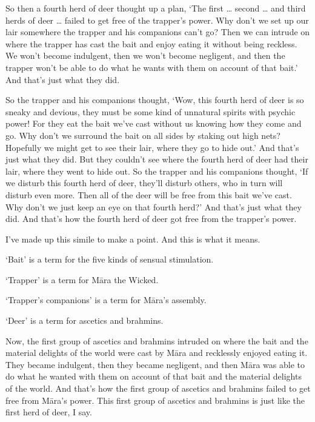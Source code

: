 \documentclass[12pt,openany]{book}%
\begin{document}
So then a fourth herd of deer thought up a plan, ‘The first … second … and third herds of deer … failed to get free of the trapper’s power. Why don’t we set up our lair somewhere the trapper and his companions can’t go? Then we can intrude on where the trapper has cast the bait and enjoy eating it without being reckless. We won’t become indulgent, then we won’t become negligent, and then the trapper won’t be able to do what he wants with them on account of that bait.’ And that’s just what they did. 

So the trapper and his companions thought, ‘Wow, this fourth herd of deer is so sneaky and devious, they must be some kind of unnatural spirits with psychic power! For they eat the bait we’ve cast without us knowing how they come and go. Why don’t we surround the bait on all sides by staking out high nets? Hopefully we might get to see their lair, where they go to hide out.’ And that’s just what they did. But they couldn’t see where the fourth herd of deer had their lair, where they went to hide out. So the trapper and his companions thought, ‘If we disturb this fourth herd of deer, they’ll disturb others, who in turn will disturb even more. Then all of the deer will be free from this bait we’ve cast. Why don’t we just keep an eye on that fourth herd?’ And that’s just what they did. And that’s how the fourth herd of deer got free from the trapper’s power. 

I’ve made up this simile to make a point. And this is what it means. 

‘Bait’ is a term for the five kinds of sensual stimulation. 

‘Trapper’ is a term for \textsanskrit{Māra} the Wicked. 

‘Trapper’s companions’ is a term for \textsanskrit{Māra}’s assembly. 

‘Deer’ is a term for ascetics and brahmins. 

Now, the first group of ascetics and brahmins intruded on where the bait and the material delights of the world were cast by \textsanskrit{Māra} and recklessly enjoyed eating it. They became indulgent, then they became negligent, and then \textsanskrit{Māra} was able to do what he wanted with them on account of that bait and the material delights of the world. And that’s how the first group of ascetics and brahmins failed to get free from \textsanskrit{Māra}’s power. This first group of ascetics and brahmins is just like the first herd of deer, I say. 
\end{document}
